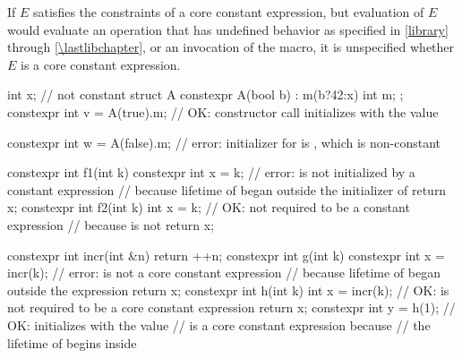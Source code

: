 If $E$ satisfies the constraints of a core constant expression, but
evaluation of $E$ would evaluate an operation that has undefined behavior
as specified in \ref{library} through \ref{\lastlibchapter}, or
an invocation of the  macro,
it is unspecified whether $E$ is a core constant expression.

\begin{example}
\begin{codeblock}
int x;                              // not constant
struct A {
  constexpr A(bool b) : m(b?42:x) { }
  int m;
};
constexpr int v = A(true).m;        // OK: constructor call initializes  with the value 

constexpr int w = A(false).m;       // error: initializer for  is , which is non-constant

constexpr int f1(int k) {
  constexpr int x = k;              // error:  is not initialized by a constant expression
                                    // because lifetime of  began outside the initializer of 
  return x;
}
constexpr int f2(int k) {
  int x = k;                        // OK: not required to be a constant expression
                                    // because  is not 
  return x;
}

constexpr int incr(int &n) {
  return ++n;
}
constexpr int g(int k) {
  constexpr int x = incr(k);        // error:  is not a core constant expression
                                    // because lifetime of  began outside the expression 
  return x;
}
constexpr int h(int k) {
  int x = incr(k);                  // OK:  is not required to be a core constant expression
  return x;
}
constexpr int y = h(1);             // OK: initializes  with the value 
                                    //  is a core constant expression because
                                    // the lifetime of  begins inside 
\end{codeblock}
\end{example}

